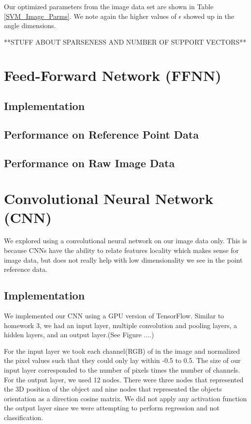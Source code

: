 \documentclass[journal]{IEEEtran}
\begin{document}
Our optimized parameters from the image data set are shown in Table \ref{SVM_Image_Parms}.  We note again the higher values of $\epsilon$ showed up in the angle dimensions.

**STUFF ABOUT SPARSENESS AND NUMBER OF SUPPORT VECTORS**

\section{Feed-Forward Network (FFNN)}

\subsection{Implementation}

\subsection{Performance on Reference Point Data}

\subsection{Performance on Raw Image Data}

\section{Convolutional Neural Network (CNN)}
We explored using a convolutional neural network on our image data only. This is because CNNs have the ability to relate features locality which makes sense for image data, but does not really help with low dimensionality we see in the point reference data.  

\subsection{Implementation}
We implemented our CNN using a GPU version of TensorFlow. Similar to homework 3, we had an input layer, multiple convolution and pooling layers, a hidden layers, and an output layer.(See Figure ....) 

For the input layer we took each channel(RGB) of in the image and normalized the pixel values such that they could only lay within -0.5 to 0.5. The size of our input layer corresponded to the number of pixels times the number of channels. For the output layer, we used 12 nodes. There were three nodes that represented the 3D position of the object and nine nodes that represented the objects orientation as a direction cosine matrix. We did not apply any activation function the output layer since we were attempting to perform regression and not classification. 
\end{document}
